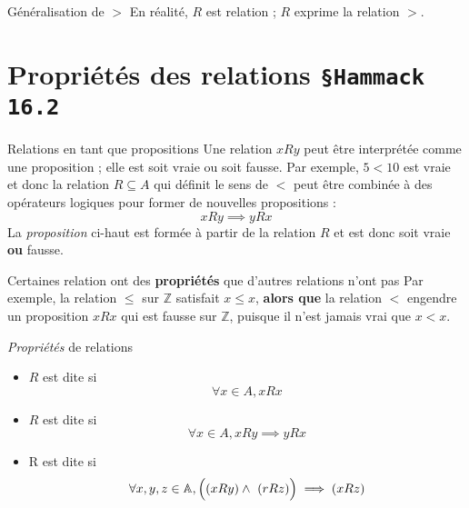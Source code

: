 \documentclass[16pt]{report}
\begin{document}
\begin{multicols*}{2}
\begin{EExample}{Généralisation de $>$}{}
                En réalité, $R$ est relation ; $R$ exprime la relation $>$.  
            \end{EExample}              
            \pagebreak


    \section{Propriétés des relations \texttt{\small{\S Hammack 16.2}}}

            \begin{Concept}{Relations en tant que propositions}{}{}
                    Une relation $xRy$ peut être interprétée comme une proposition ; elle est soit vraie 
                    ou soit fausse. Par exemple, $5 < 10$ est vraie et donc la relation $R \subseteq A$ qui 
                    définit le sens de $<$ peut être combinée à des opérateurs logiques pour former de 
                    nouvelles propositions  :
                                    \[ xRy  \implies yRx \]
                    La \textit{proposition} ci-haut est formée à partir de la relation $R$ et est donc soit 
                    vraie \textbf{ou} fausse.   
            \end{Concept}       
            
            
            \begin{note}{}{}
                Certaines relation ont des \textbf{propriétés} que d'autres relations n'ont pas  
                Par exemple, la relation $\leq$ sur $\mathbb{Z}$ satisfait $x \leq x$, \textbf{alors que}
                la relation $<$ engendre un proposition $xRx$ qui est fausse sur $\mathbb{Z}$, puisque 
                il n'est jamais vrai que $x<x$. 
           \end{note}

           \begin{Definitionx}{\textit{Propriétés} de relations}{}
               \begin{itemize}
                \item $R$ est dite  si 
                    \[ \forall x \in A, xRx \]

                \item $R$ est dite  si  
                    \[ \forall x \in A, xRy \implies yRx \]

                \item R est dite  si 
                    \[ \forall x, y, z \in \mathbb{A}, \Bigl( (xRy)\land\ (rRz) \Bigr) \implies (xRz)\]
               \end{itemize}
           \end{Definitionx}



\end{multicols*}
\end{document}
